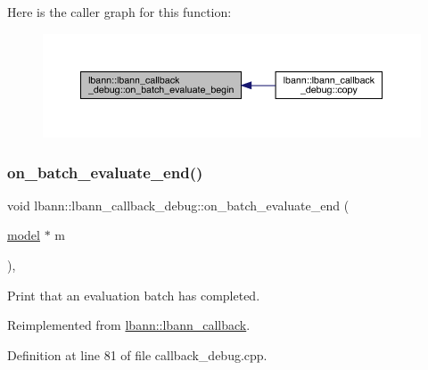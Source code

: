 Here is the caller graph for this function\+:\nopagebreak
\begin{figure}[H]
\begin{center}
\leavevmode
\includegraphics[width=350pt]{classlbann_1_1lbann__callback__debug_ac364fb6e77dc163e146af77bb670d74b_icgraph}
\end{center}
\end{figure}
\mbox{\label{classlbann_1_1lbann__callback__debug_a07a02eb525ebe9c06b361c48fc2977c8}} 
\subsubsection{\texorpdfstring{on\+\_\+batch\+\_\+evaluate\+\_\+end()}{on\_batch\_evaluate\_end()}}
{\footnotesize\ttfamily void lbann\+::lbann\+\_\+callback\+\_\+debug\+::on\+\_\+batch\+\_\+evaluate\+\_\+end (\begin{DoxyParamCaption}\item[{\hyperlink{classlbann_1_1model}{model} $\ast$}]{m }\end{DoxyParamCaption})\hspace{0.3cm}{\ttfamily [override]}, {\ttfamily [virtual]}}

Print that an evaluation batch has completed. 

Reimplemented from \hyperlink{classlbann_1_1lbann__callback_ad10891b8ab3de74ee1a70e6255e7d58a}{lbann\+::lbann\+\_\+callback}.



Definition at line 81 of file callback\+\_\+debug.\+cpp.


